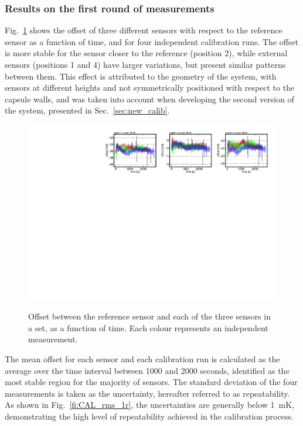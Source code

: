 \subsubsection{Results on the first round of measurements}
\noindent Fig.~\ref{fi:CAL_offset_example} shows the offset of three different sensors with respect to the reference sensor as a function of time, and for four independent calibration runs. The offset is more stable for the sensor closer to the reference (position 2), while external sensors (positions 1 and 4) have larger variations, but present similar patterns between them. This effect is attributed to the geometry of the system, with sensors at different heights and not symmetrically positioned with respect to the capsule walls, and was taken into account when developing the second version of the system, presented in Sec.~\ref{sec:new_calib}. 

\label{sec:results_first_round}
\begin{figure}[htbp]
\centering
{\includegraphics[width=\textwidth]{images/figure_10.pdf}}
\caption{Offset between the reference sensor and each of the three sensors in a set, as a function of time. Each colour represents an independent measurement.}
\label{fi:CAL_offset_example}
\end{figure}

The mean offset for each sensor and each calibration run is calculated as the average over the time interval between 1000 and 2000 seconds, identified as the most stable region for the majority of sensors. The standard deviation of the four measurements is taken as the uncertainty, hereafter referred to as repeatability. As shown in Fig.~\ref{fi:CAL_rms_1r}, the uncertainties are generally below 1~mK, demonstrating the high level of repeatability achieved in the calibration process. 


